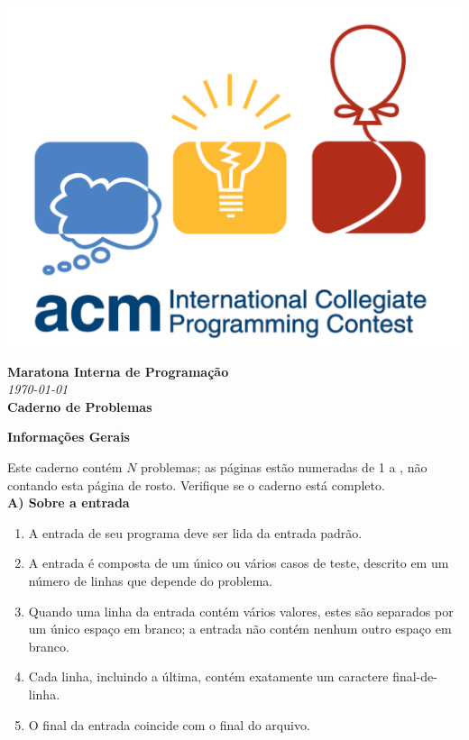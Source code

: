 \documentclass[11pt,oneside,a4paper]{book}
\begin{document}
\begin{titlepage}
\begin{center}
\vspace{2em}
\includegraphics[scale=0.17]{logoacm.png}


\vspace{2em}
\large{\textbf{Maratona Interna de Programação}} \\

\vspace{1em}
\textit{\today} \\

\vspace{3em}
\textbf{Caderno de Problemas} \\
\end{center}

\vspace{7em}
\begin{center}
\textbf{Informações Gerais} \\
\end{center}

\noindent
Este caderno contém $N$ problemas; as páginas estão numeradas de 1 a \pageref{LastPage}, não contando esta página de rosto.
Verifique se o caderno está completo. \\

\textbf{A) Sobre a entrada}
\begin{enumerate}
\setlength{\itemsep}{0pt}
\setlength{\parskip}{0pt}
\setlength{\parsep}{0pt} 
\item A entrada de seu programa deve ser lida da entrada padrão.
\item A entrada é composta de um único ou vários casos de teste, descrito em um número de linhas que depende do problema.
\item Quando uma linha da entrada contém vários valores, estes são separados por um único espaço em branco; a
entrada não contém nenhum outro espaço em branco.
\item Cada linha, incluindo a última, contém exatamente um caractere final-de-linha.
\item O final da entrada coincide com o final do arquivo.
\end{enumerate} 


\end{titlepage}
\end{document}
